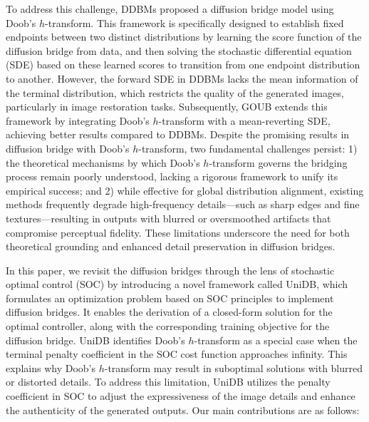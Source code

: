 To address this challenge, DDBMs \cite{zheng2024diffusionbridgeimplicitmodels} proposed a diffusion bridge model using Doob's $h$-transform. This framework is specifically designed to establish fixed endpoints between two distinct distributions by learning the score function of the diffusion bridge from data, and then solving the stochastic differential equation (SDE) based on these learned scores to transition from one endpoint distribution to another. However, the forward SDE in DDBMs lacks the mean information of the terminal distribution, which restricts the quality of the generated images, particularly in image restoration tasks. Subsequently, GOUB \cite{yue2024imagerestorationgeneralizedornsteinuhlenbeck} extends this framework by integrating Doob's $h$-transform with a mean-reverting SDE, achieving better results compared to DDBMs. 
Despite the promising results in diffusion bridge with Doob's $h$-transform, two fundamental challenges persist: 1) the theoretical mechanisms by which Doob's $h$-transform governs the bridging process remain poorly understood, lacking a rigorous framework to unify its empirical success; and 2) while effective for global distribution alignment, existing methods frequently degrade high-frequency details—such as sharp edges and fine textures—resulting in outputs with blurred or oversmoothed artifacts that compromise perceptual fidelity. These limitations underscore the need for both theoretical grounding and enhanced detail preservation in diffusion bridges. 


In this paper, we revisit the diffusion bridges through the lens of stochastic optimal control (SOC) by introducing a novel framework called UniDB, which formulates an optimization problem based on SOC principles to implement diffusion bridges. It enables the derivation of a closed-form solution for the optimal controller, along with the corresponding training objective for the diffusion bridge. UniDB identifies Doob's $h$-transform as a special case when the terminal penalty coefficient in the SOC cost function approaches infinity. This explains why Doob's $h$-transform may result in suboptimal solutions with blurred or distorted details. To address this limitation, UniDB utilizes the penalty coefficient in SOC to adjust the expressiveness of the image details and enhance the authenticity of the generated outputs. Our main contributions are as follows: 

